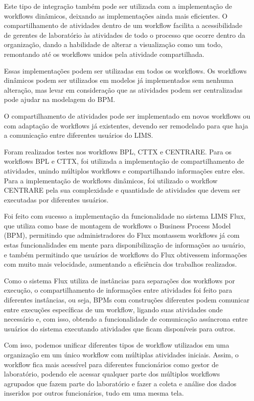 Este tipo de integração também pode ser utilizada com a implementação de workflows dinâmicos, deixando as implementações ainda mais eficientes. O compartilhamento de atividades dentro de um workflow facilita a acessibilidade de gerentes de laboratório às atividades de todo o processo que ocorre dentro da organização, dando a habilidade de alterar a visualização como um todo, remontando até os workflows unidos pela atividade compartilhada.

Essas implementações podem ser utilizadas em todos os workflows. Os workflows dinâmicos podem ser utilizados em modelos já implementados sem nenhuma alteração, mas levar em consideração que as atividades podem ser centralizadas pode ajudar na modelagem do BPM.

O compartilhamento de atividades pode ser implementado em novos workflows ou com adaptação de workflows já existentes, devendo ser remodelado para que haja a comunicação entre diferentes usuários do LIMS.

Foram realizados testes nos workflows BPL, CTTX e CENTRARE. Para os workflows BPL e CTTX, foi utilizada a implementação de compartilhamento de atividades, unindo múltiplos workflows e compartilhando informações entre eles. Para a implementação de workflows dinâmicos, foi utilizado o workflow CENTRARE pela sua complexidade e quantidade de atividades que devem ser executadas por diferentes usuários.

Foi feito com sucesso a implementação da funcionalidade no sistema LIMS Flux, que utiliza como base de montagem de workflows o Business Process Model (BPM), permitindo que administradores do Flux montassem workflows já com estas funcionalidades em mente para disponibilização de informações ao usuário, e também permitindo que usuários de workflows do Flux obtivessem informações com muito mais velocidade, aumentando a eficiência dos trabalhos realizados.

Como o sistema Flux utiliza de instâncias para separações dos workflows por execução, o compartilhamento de informações entre atividades foi feito para diferentes instâncias, ou seja, BPMs com construções diferentes podem comunicar entre execuções específicas de um workflow, ligando suas atividades onde necessário e, com isso, obtendo a funcionalidade de comunicação assíncrona entre usuários do sistema executando atividades que ficam disponíveis para outros.

Com isso, podemos unificar diferentes tipos de workflow utilizados em uma organização em um único workflow com múltiplas atividades iniciais. Assim, o workflow fica mais acessível para diferentes funcionários como gestor de laboratório, podendo ele acessar qualquer parte dos múltiplos workflows agrupados que fazem parte do laboratório e fazer a coleta e análise dos dados inseridos por outros funcionários, tudo em uma mesma tela.

